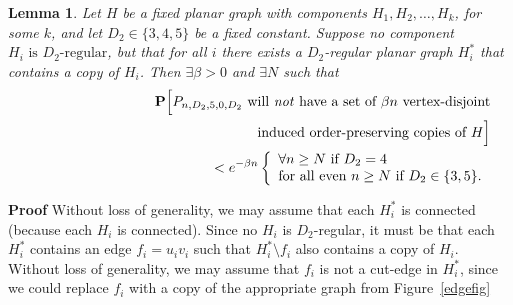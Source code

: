 \documentclass{article}
\newtheorem{Lemma}[Theorem]{Lemma}
\newtheorem{Proof of Theorem}{Proof of Theorem}
\begin{document}
\begin{Lemma} \label{bounded901}
Let $H$ be a fixed planar graph with components $H_{1}, H_{2}, \ldots, H_{k}$, for some $k$,
and let $D_{2} \in \{3,4,5 \}$ be a fixed constant.
Suppose no component $H_{i} \textrm{ is $D_{2}$-regular}$,
but that for all $i$ there exists a $D_{2}$-regular planar graph $H_{i}^{*}$ that contains a copy of $H_{i}$.
Then $\exists \beta > 0$ and $\exists N$ such that
\begin{eqnarray*}
& & \mathbf{P} \Big[
\textrm{$P_{n,D_{2},5,0,D_{2}}$
will \emph{not} have a set of $\beta n$ vertex-disjoint} \\
& & \phantom{wwwwwwwwwwq}\textrm{induced order-preserving copies of $H$}\Big] \\
& & \phantom{wwwwwwwwwwwwwwww}< e^{- \beta n} 
\left \{ \begin{array}{ll}
\forall n \geq N \textrm{ if } D_{2}=4 \\
\textrm{for all even } n \geq N \textrm{ if } D_{2} \in \{ 3,5 \}.
\end{array} \right.
\end{eqnarray*}
\end{Lemma}
\textbf{Proof}
Without loss of generality,
we may assume that each $H_{i}^{*}$ is connected
(because each $H_{i}$ is connected).
Since no $H_{i}$ is $D_{2}$-regular,
it must be that each~$H_{i}^{*}$ contains an edge $f_{i}=u_{i}v_{i}$
such that $H_{i}^{*} \setminus f_{i}$ also contains a copy of $H_{i}$.
Without loss of generality,
we may assume that $f_{i}$ is not a cut-edge in $H_{i}^{*}$,
since we could replace $f_{i}$ with a copy of the appropriate graph from Figure~\ref{edgefig}
\end{document}
